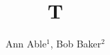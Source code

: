 \documentclass{iopart}

\title{T}
\author{Ann Able${}^{1}$, Bob Baker${}^{2}$}
\address{$^1$ Univ A}
\address{$^2$ Univ B}
\maketitle
Text.

